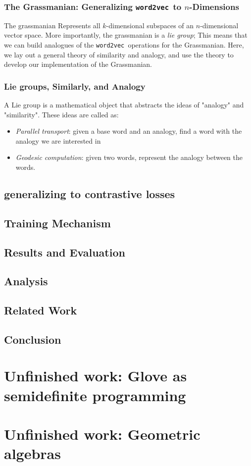\documentclass{book}
\newcommand{\wtov}{\texttt{word2vec }}
\begin{document}
\subsection{The Grassmanian: Generalizing \wtov to $n$-Dimensions}

The grassmanian Represents all $k$-dimensional subspaces of an $n$-dimensional
vector space. More importantly, the grassmanian is a \emph{lie group}; This means
that we can build analogues of the \wtov operations for the Grassmanian. Here,
we lay out a general theory of similarity and analogy, and use the theory to
develop our implementation of the Grassmanian.

\subsection{Lie groups, Similarly, and Analogy}
A Lie group is a mathematical object that abstracts the ideas of "analogy"
and "similarity". These ideas are called as:
\begin{itemize}
\item \emph{Parallel transport}: given a base word and an analogy, find a word with the analogy we are interested in
\item \emph{Geodesic computation}: given two words, represent the analogy between the words.
\end{itemize}

\section{generalizing to contrastive losses}


\section{Training Mechanism}

\section{Results and Evaluation}

\section{Analysis}

\section{Related Work}

\section{Conclusion}

\chapter{Unfinished work: Glove as semidefinite programming}


\chapter{Unfinished work: Geometric algebras}



\end{document}
